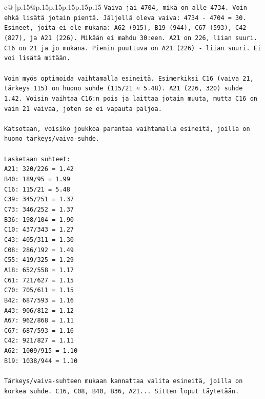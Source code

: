 \documentclass{article}
\begin{document}
{\begin{supertabular}{c@{$\;$}|p{.15\linewidth}@{}p{.15\linewidth}p{.15\linewidth}p{.15\linewidth}p{.15\linewidth}p{.15\linewidth}}
{{{\texttt{Vaiva jäi 4704, mikä on alle 4734. Voin ehkä lisätä jotain pientä. Jäljellä oleva vaiva: 4734 {-} 4704 = 30.} \\
\texttt{Esineet, joita ei ole mukana: A62 (915), B19 (944), C67 (593), C42 (827), ja A21 (226). Mikään ei mahdu 30:een. A21 on 226, liian suuri. C16 on 21 ja jo mukana. Pienin puuttuva on A21 (226) {-} liian suuri. Ei voi lisätä mitään.} \\
\\ 
\texttt{Voin myös optimoida vaihtamalla esineitä. Esimerkiksi C16 (vaiva 21, tärkeys 115) on huono suhde (115/21 ≈ 5.48). A21 (226, 320) suhde 1.42. Voisin vaihtaa C16:n pois ja laittaa jotain muuta, mutta C16 on vain 21 vaivaa, joten se ei vapauta paljoa.} \\
\\ 
\texttt{Katsotaan, voisiko joukkoa parantaa vaihtamalla esineitä, joilla on huono tärkeys/vaiva{-}suhde.} \\
\\ 
\texttt{Lasketaan suhteet:} \\
\texttt{A21: 320/226 = 1.42} \\
\texttt{B40: 189/95 = 1.99} \\
\texttt{C16: 115/21 = 5.48} \\
\texttt{C39: 345/251 = 1.37} \\
\texttt{C73: 346/252 = 1.37} \\
\texttt{B36: 198/104 = 1.90} \\
\texttt{C10: 437/343 = 1.27} \\
\texttt{C43: 405/311 = 1.30} \\
\texttt{C08: 286/192 = 1.49} \\
\texttt{C55: 419/325 = 1.29} \\
\texttt{A18: 652/558 = 1.17} \\
\texttt{C61: 721/627 = 1.15} \\
\texttt{C70: 705/611 = 1.15} \\
\texttt{B42: 687/593 = 1.16} \\
\texttt{A43: 906/812 = 1.12} \\
\texttt{A67: 962/868 = 1.11} \\
\texttt{C67: 687/593 = 1.16} \\
\texttt{C42: 921/827 = 1.11} \\
\texttt{A62: 1009/915 = 1.10} \\
\texttt{B19: 1038/944 = 1.10} \\
\\ 
\texttt{Tärkeys/vaiva{-}suhteen mukaan kannattaa valita esineitä, joilla on korkea suhde. C16, C08, B40, B36, A21... Sitten loput täytetään.} \\
}}}
\end{supertabular}}
\end{document}

